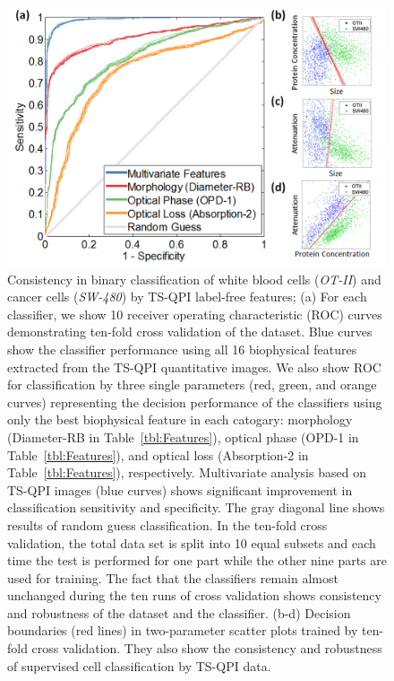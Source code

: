 \documentclass[aps,pra,reprint,superscriptaddress]{revtex4-1}
\begin{document}
\begin{figure}
\includegraphics[scale=0.2]{FigureOTSWROC.jpg}
\caption{\label{fig:OTSWROC} Consistency in binary classification of white blood cells (\textit{OT-II}) and cancer cells (\textit{SW-480}) by TS-QPI label-free features; (a) For each classifier, we show 10 receiver operating characteristic (ROC) curves demonstrating ten-fold cross validation of the dataset. Blue curves show the classifier performance using all 16 biophysical features extracted from the TS-QPI quantitative images. We also show ROC for classification by three single parameters (red, green, and orange curves) representing the decision performance of the classifiers using only the best biophysical feature in each catogary: morphology (Diameter-RB in Table~\ref{tbl:Features}), optical phase (OPD-1 in Table~\ref{tbl:Features}), and optical loss (Absorption-2 in Table~\ref{tbl:Features}), respectively. Multivariate analysis based on TS-QPI images (blue curves) shows significant improvement in classification sensitivity and specificity. The gray diagonal line shows results of random guess classification. In the ten-fold cross validation, the total data set is split into 10 equal subsets and each time the test is performed for one part while the other nine parts are used for training. The fact that the classifiers remain almost unchanged during the ten runs of cross validation shows consistency and robustness of the dataset and the classifier. (b-d) Decision boundaries (red lines) in two-parameter scatter plots trained by ten-fold cross validation. They also show the consistency and robustness of supervised cell classification by TS-QPI data.}
\end{figure}
\end{document}
